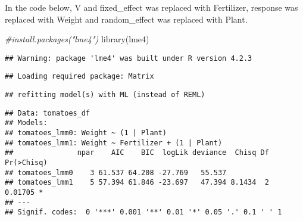 \documentclass[
]{article}
\newenvironment{Shaded}{\begin{snugshade}}{\end{snugshade}}
\newcommand{\AttributeTok}[1]{\textcolor[rgb]{0.77,0.63,0.00}{#1}}
\newcommand{\CommentTok}[1]{\textcolor[rgb]{0.56,0.35,0.01}{\textit{#1}}}
\newcommand{\DecValTok}[1]{\textcolor[rgb]{0.00,0.00,0.81}{#1}}
\newcommand{\FunctionTok}[1]{\textcolor[rgb]{0.00,0.00,0.00}{#1}}
\newcommand{\NormalTok}[1]{#1}
\newcommand{\OtherTok}[1]{\textcolor[rgb]{0.56,0.35,0.01}{#1}}
\newcommand{\SpecialCharTok}[1]{\textcolor[rgb]{0.00,0.00,0.00}{#1}}
\begin{document}
In the code below, V and fixed\_effect was replaced with Fertilizer,
response was replaced with Weight and random\_effect was replaced with
Plant.

\begin{Shaded}
\begin{Highlighting}[]
\CommentTok{\#install.packages("lme4")}
\FunctionTok{library}\NormalTok{(lme4)}
\end{Highlighting}
\end{Shaded}

\begin{verbatim}
## Warning: package 'lme4' was built under R version 4.2.3
\end{verbatim}

\begin{verbatim}
## Loading required package: Matrix
\end{verbatim}

\begin{Shaded}
\end{Shaded}

\begin{verbatim}
## refitting model(s) with ML (instead of REML)
\end{verbatim}

\begin{verbatim}
## Data: tomatoes_df
## Models:
## tomatoes_lmm0: Weight ~ (1 | Plant)
## tomatoes_lmm1: Weight ~ Fertilizer + (1 | Plant)
##               npar    AIC    BIC  logLik deviance  Chisq Df Pr(>Chisq)  
## tomatoes_lmm0    3 61.537 64.208 -27.769   55.537                       
## tomatoes_lmm1    5 57.394 61.846 -23.697   47.394 8.1434  2    0.01705 *
## ---
## Signif. codes:  0 '***' 0.001 '**' 0.01 '*' 0.05 '.' 0.1 ' ' 1
\end{verbatim}
\end{document}
